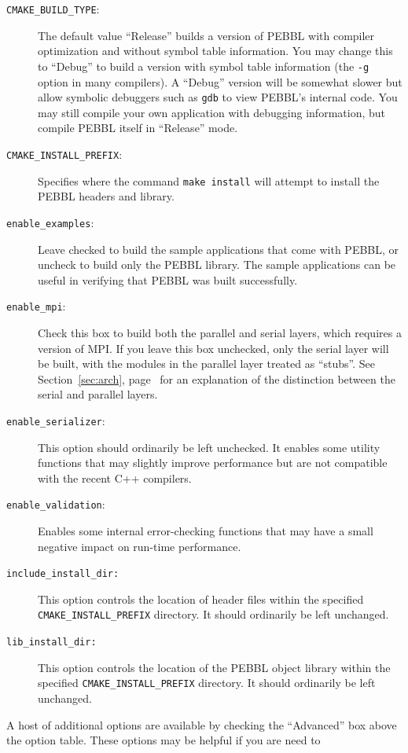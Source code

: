 \begin{description}
\item[\texttt{CMAKE\_BUILD\_TYPE}:] The default value ``Release'' builds a
version of PEBBL with compiler optimization and without symbol table
information.  You may change this to ``Debug'' to build a version with symbol
table information (the \texttt{-g} option in many compilers).  A ``Debug''
version will be somewhat slower but allow symbolic debuggers such as
\texttt{gdb} to view PEBBL's internal code.  You may still compile your own
application with debugging information, but compile PEBBL itself in
``Release'' mode.
\item[\texttt{CMAKE\_INSTALL\_PREFIX}:] Specifies where the command
\texttt{make install} will attempt to install the PEBBL headers and library.
\item[\texttt{enable\_examples}:]  Leave checked to build the sample
applications that come with PEBBL, or uncheck to build only the PEBBL library.
The sample applications can be useful in verifying that PEBBL was built
successfully. 
\item[\texttt{enable\_mpi}:]  Check this box to build both the parallel and
serial layers, which requires a version of MPI.  If you leave this box
unchecked, only the serial layer will be built, with the modules in the
parallel layer treated as ``stubs''.  See Section~\ref{sec:arch},
page~\pageref{sec:arch} for an explanation of the distinction between the
serial and parallel layers.
\item[\texttt{enable\_serializer}:]  This option should ordinarily be left
unchecked.  It enables some utility functions that may slightly improve
performance but are not compatible with the recent C++ compilers.
\item[\texttt{enable\_validation}:]  Enables some internal error-checking
functions that may have a small negative impact on run-time performance.
\item[\texttt{include\_install\_dir:}] This option controls the location of
header files within the specified \texttt{CMAKE\_INSTALL\_PREFIX} directory.
It should ordinarily be left unchanged.
\item[\texttt{lib\_install\_dir:}] This option controls the location of the
PEBBL object library within the specified \texttt{CMAKE\_INSTALL\_PREFIX} directory.
It should ordinarily be left unchanged.
\end{description}
A host of additional options are available by checking the ``Advanced'' box
above the option table.  These options may be helpful if you are need to
